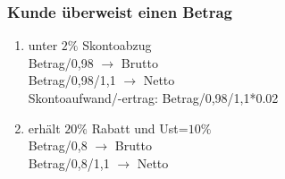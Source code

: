 \documentclass[paper=a4, fontsize=11pt]{scrartcl}
\numberwithin{equation}{section}
\numberwithin{figure}{section}
\numberwithin{table}{section}
\begin{document}
\subsubsection{Kunde überweist einen Betrag}
\begin{enumerate}
\item unter $2 \%$ Skontoabzug \\
Betrag/0,98 $\rightarrow$ Brutto \\
Betrag/0,98/1,1 $\rightarrow$ Netto \\
Skontoaufwand/-ertrag: Betrag/0,98/1,1*0.02
\item erhält $20 \%$ Rabatt und Ust=$10 \%$\\
Betrag/0,8 $\rightarrow$ Brutto \\
Betrag/0,8/1,1 $\rightarrow$ Netto \\
\end{enumerate}
\end{document}
